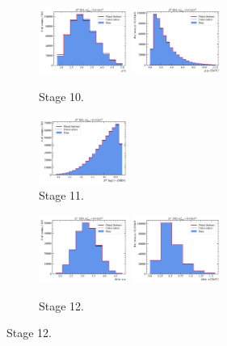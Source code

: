 \begin{figure}[htb]
    \begin{subfigure}{\textwidth}
        \centering
        \includegraphics[width=0.32\textwidth]{./figs-mc-correction/reweighting-final/plot_step9-D0_iso-mu_eta.pdf}
        \includegraphics[width=0.32\textwidth]{./figs-mc-correction/reweighting-final/plot_step9-D0_iso-mu_pt.pdf}
        \caption{Stage 10.}
    \end{subfigure}

    \begin{subfigure}{\textwidth}
        \centering
        \includegraphics[width=0.32\textwidth]{./figs-mc-correction/reweighting-final/plot_step10-D0_iso-d0_comp2.pdf}
        \caption{Stage 11.}
    \end{subfigure}

    \begin{subfigure}{\textwidth}
        \centering
        \includegraphics[width=0.32\textwidth]{./figs-mc-correction/reweighting-final/plot_step11-Dst_iso-spi_eta.pdf}
        \includegraphics[width=0.32\textwidth]{./figs-mc-correction/reweighting-final/plot_step11-Dst_iso-spi_pt.pdf}
        \caption{Stage 12.}
    \end{subfigure}


\end{figure}
